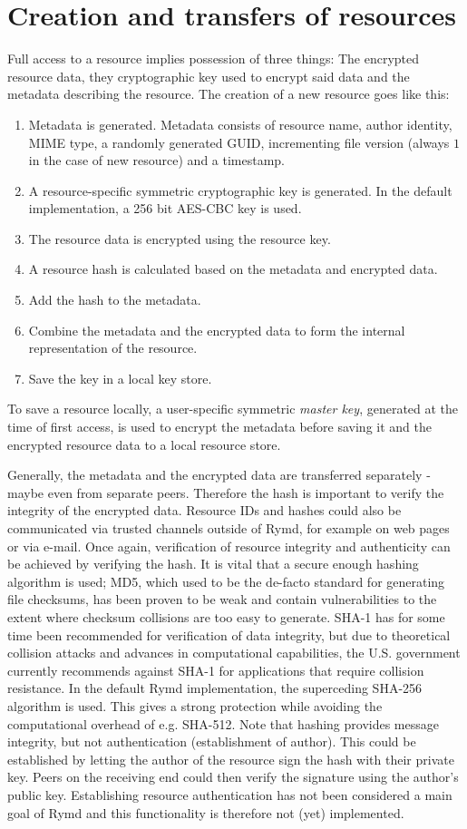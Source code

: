 \section{Creation and transfers of resources}
Full access to a resource implies possession of three things: The encrypted resource data, they cryptographic key used to encrypt said data and the metadata describing the resource. The creation of a new resource goes like this:
\begin{enumerate}
  \item Metadata is generated. Metadata consists of resource name, author identity, MIME type, a randomly generated GUID, incrementing file version (always $1$ in the case of new resource) and a timestamp.
  \item A resource-specific symmetric cryptographic key is generated. In the default implementation, a 256 bit AES-CBC key is used.
  \item The resource data is encrypted using the resource key.
  \item A resource hash is calculated based on the metadata and encrypted data. 
  \item Add the hash to the metadata.
  \item Combine the metadata and the encrypted data to form the internal representation of the resource.
  \item Save the key in a local key store.
\end{enumerate}

To save a resource locally, a user-specific symmetric \emph{master key}, generated at the time of first access, is used to encrypt the metadata before saving it and the encrypted resource data to a local resource store.

Generally, the metadata and the encrypted data are transferred separately - maybe even from separate peers. Therefore the hash is important to verify the integrity of the encrypted data. Resource IDs and hashes could also be communicated via trusted channels outside of Rymd, for example on web pages or via e-mail. Once again, verification of resource integrity and authenticity can be achieved by verifying the hash. It is vital that a secure enough hashing algorithm is used; MD5, which used to be the de-facto standard for generating file checksums, has been proven to be weak and contain vulnerabilities to the extent where checksum collisions are too easy to generate. SHA-1 has for some time been recommended for verification of data integrity, but due to theoretical collision attacks and advances in computational capabilities, the U.S. government currently recommends against SHA-1 for applications that require collision resistance\cite{NIST:2012}. In the default Rymd implementation, the superceding SHA-256 algorithm is used. This gives a strong protection while avoiding the computational overhead of e.g. SHA-512. Note that hashing provides message integrity, but not authentication (establishment of author). This could be established by letting the author of the resource sign the hash with their private key. Peers on the receiving end could then verify the signature using the author's public key. Establishing resource authentication has not been considered a main goal of Rymd and this functionality is therefore not (yet) implemented.

